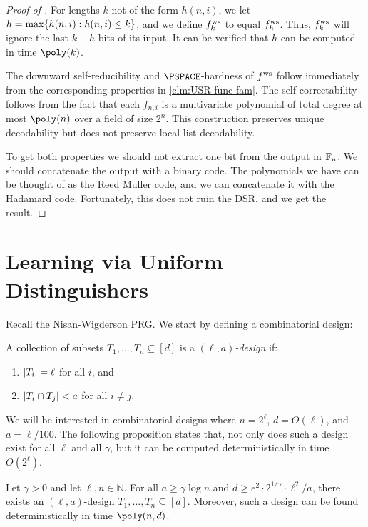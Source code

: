 \begin{proof}[Proof of  ]
	For lengths $k$ not of the form $h(n, i)$, we let $h = \max \{h(n, i) : h(n, i) \leq k\}$, and we define $ f^{\text{ws}} _k$ to equal $ f^{\text{ws}} _h$. Thus, $ f^{\text{ws}} _k$ will ignore the last $k-h$ bits of its input. It can be verified that $h$ can be computed in time $\poly(k)$.

	The downward self-reducibility and $\PSPACE$-hardness of $ f^{\text{ws}} $ follow immediately from the corresponding properties in \ref{clm:USR-func-fam}. The self-correctability follows from the fact that each $f_{n,i}$ is a multivariate polynomial of total degree at most $\poly(n)$ over a field of size $2^n$. This construction preserves unique decodability but does not preserve local list decodability. 
	
	To get both properties we should not extract one bit from the output in $\mathbb{F}_n$. We should concatenate the output with a binary code. The polynomials we have can be thought of as the Reed Muller code, and we can concatenate it with the Hadamard code. Fortunately, this does not ruin the DSR, and we get the result.
\end{proof}

\section{Learning via Uniform Distinguishers}

Recall the Nisan-Wigderson PRG. We start by defining a combinatorial design:
\begin{definition}
	A collection of subsets $T_1, \dots, T_n \subseteq [d]$ is a \emph{$(\ell, a)$-design} if:
	\begin{enumerate}
		\item $\lvert T_i\rvert = \ell$ for all $i$, and
		\item $\lvert T_i \cap T_j\rvert < a$ for all $i \ne j$.
	\end{enumerate}
\end{definition}

We will be interested in combinatorial designs where $n = 2^\ell$, $d =
O(\ell)$, and $a = \ell/100$. The following proposition states that, not only does such a design exist for all $\ell$ and all $\gamma$, but it can be computed deterministically in time $O(2^\ell)$.

\begin{proposition} \label{prop:comb-design}
	Let $\gamma > 0 $ and let $\ell, n \in \mathbb{N}$. For all $a \ge \gamma
	\log{n}$ and $d \ge e^2 \cdot 2^{1/\gamma} \cdot \ell^2/a$, there exists an
	$(\ell, a)$-design $T_1, \dots, T_n \subseteq [d]$. Moreover, such a design
	can be found deterministically in time $\poly(n, d)$.
\end{proposition}


